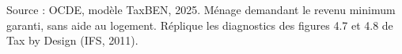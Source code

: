 Source : OCDE, modèle TaxBEN, 2025. Ménage demandant le revenu minimum garanti, sans aide au logement. Réplique les diagnostics des figures 4.7 et 4.8 de Tax by Design (IFS, 2011).
